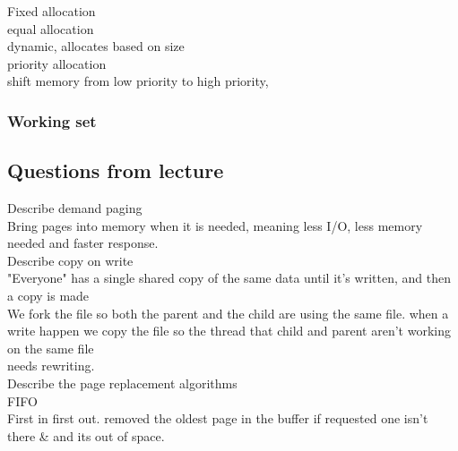 \documentclass[a4paper,10pt,titlepage]{report}
\begin{document}
\hspace{10mm} Fixed allocation \\

\hspace{15mm} equal allocation \\
\hspace{20mm} dynamic, allocates based on size \\

\hspace{10mm} priority allocation \\

\hspace{15mm} shift memory from low priority to high priority, \\

\subsubsection{Working set}


\newpage
\subsection{Questions from lecture}

Describe demand paging \\
 \hspace{10mm}Bring pages into memory when it is needed, meaning less I/O, less memory needed and faster response. \\

Describe copy on write\\
\hspace{10mm}"Everyone" has a single shared copy of the same data until it's written, and then a copy is made \\

\hspace{10mm}We fork the file so both the parent and the child are using the same file. when a write happen we copy the file so the thread that child and parent aren't working on the same file \\

needs rewriting.\\

Describe the page replacement algorithms\\

\hspace{10mm}FIFO\\
\hspace{15mm}First in first out. removed the oldest page in the buffer if requested one isn't there \& and its out of space.\\
\vspace{5mm}
\end{document}
